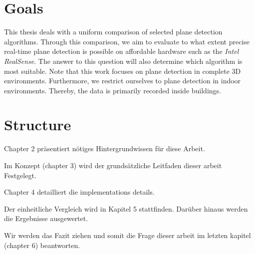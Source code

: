 \documentclass[main.tex]{subfiles}
\begin{document}
\section{Goals}

This thesis deals with a uniform comparison of selected plane detection algorithms. 
Through this comparison, we aim to evaluate to what extent precise real-time plane detection is possible on affordable 
hardware such as the \textit{Intel RealSense}. The answer to this question will also determine which algorithm is most suitable. 
Note that this work focuses on plane detection in complete 3D environments. 
Furthermore, we restrict ourselves to plane detection in indoor environments. 
Thereby, the data is primarily recorded inside buildings. 

\section{Structure}
Chapter 2 präsentiert nötiges Hintergrundwissen für diese Arbeit.

Im Konzept (chapter 3) wird der grundsätzliche Leitfaden dieser arbeit Festgelegt.

Chapter 4 detailliert die implementations details.

Der einheitliche Vergleich wird in Kapitel 5 stattfinden. Darüber hinaus werden die Ergebnisse ausgewertet.

Wir werden das Fazit ziehen und somit die Frage dieser arbeit im letzten kapitel (chapter 6) beantworten.
\end{document}
